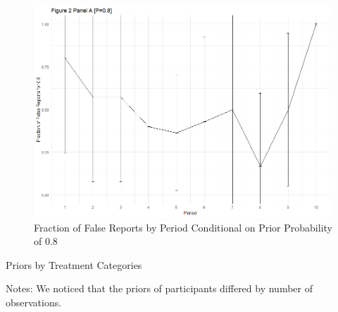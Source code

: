\documentclass[12pt,a4paper]{article}
\begin{document}
	\begin{figure}
		\centering
		\includegraphics[scale=0.4]{../../results/2a_80.png}
		\caption{Fraction of False Reports by Period Conditional on Prior Probability of 0.8} \label{tab:F6}
		\label{fig:enter-label}
	\end{figure}
	
	
	\newpage
	
	\begin{table}[H]
		\centering
		\caption{Priors by Treatment Categories} \label{tab:table1}
		\begin{threeparttable}
			\footnotesize 
			 
			\begin{tablenotes}
				\scriptsize 
				\item{Notes: We noticed that the priors of participants differed by number of observations.
				}
			\end{tablenotes}  
		\end{threeparttable}                          
	\end{table}
	
\end{document}
